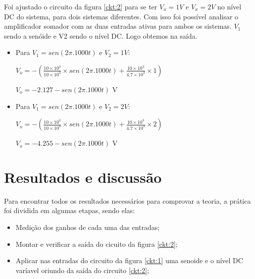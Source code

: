 Foi ajustado o circuito da figura \ref{ckt:2} para se ter $ V_x = 1V$ e $V_x = 2V$ no nível DC do sistema, para dois sistemas diferentes. Com isso foi possível analisar o amplificador somador com as duas entradas ativas para ambos os sistemas. $V_1$ sendo a senóide e V2 sendo o nível DC. Logo obtemos na saída.

\begin{itemize}
    \item Para $V_1 = sen(2\pi.1000t)$ e $V_2 = 1V$:
    \begin{center}
        $V_{o} = - \left(\frac{10 \times 10^3}{10 \times 10^3} \times  sen(2\pi.1000t) + \frac{10 \times 10^3}{4.7 \times 10^3} \times 1 \right)$
    \end{center}
     \begin{center}
        $V_{o} = - 2.127 - sen(2\pi.1000t) $ V
    \end{center}
    
    
    \item Para $V_1 = sen(2\pi.1000t) $ e $V_2 = 2V$:
    
    \begin{center}
        $V_{o} = - \left(\frac{10 \times 10^3}{10 \times 10^3} \times  sen(2\pi.1000t) + \frac{10 \times 10^3}{4.7 \times 10^3} \times 2 \right)$
    \end{center}
     \begin{center}
        $V_{o} = - 4.255 - sen(2\pi.1000t) $ V
    \end{center}
\end{itemize}



\section{Resultados e discussão}

Para encontrar todos os resultados necessários para comprovar a teoria, a prática foi dividida em algumas etapas, sendo elas:

\begin{itemize}
    \item Medição dos ganhos de cada uma das entradas;
    \item Montar e verificar a saída do cicuito da figura \ref{ckt:2};
    \item Aplicar nas entradas do circuito da figura \ref{ckt:1} uma senoide e o nível DC varíavel oriundo da saída do circuito \ref{ckt:2};
\end{itemize}

